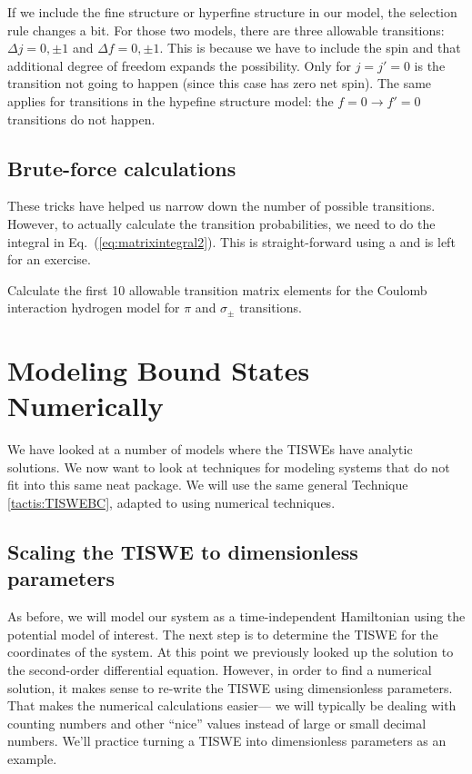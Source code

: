 If we include the fine structure or hyperfine structure in our model, the selection rule changes a bit. For those two models, there are three allowable transitions: $\Delta j = 0,\pm 1$ and $\Delta f = 0, \pm 1$. This is because we have to include the spin and that additional degree of freedom expands the possibility. Only for $j=j'=0$ is the transition not going to happen (since this case has zero net spin). The same applies for transitions in the hypefine structure model: the $f = 0 \rightarrow f'=0$ transitions do not happen.

\section{Brute-force calculations}

These tricks have helped us narrow down the number of possible transitions. However, to actually calculate the transition probabilities, we need to do the integral in Eq.~(\ref{eq:matrixintegral2}). This is straight-forward using a \CAS and is left for an exercise.

\begin{exercise}
Calculate the first 10 allowable transition matrix elements for the Coulomb interaction hydrogen model for $\pi$ and $\sigma_\pm$ transitions.
\end{exercise}


\chapter{Modeling Bound States Numerically}

We have looked at a number of models where the TISWEs have analytic solutions. We now want to look at techniques for modeling systems that do not fit into this same neat package. We will use the same general Technique \ref{tactis:TISWEBC}, adapted to using numerical techniques.

\section{Scaling the TISWE to dimensionless parameters}

As before, we will model our system as a time-independent Hamiltonian using the potential model of interest. The next step is to determine the TISWE for the coordinates of the system. At this point we previously looked up the solution to the second-order differential equation. However, in order to find a numerical solution, it makes sense to re-write the TISWE using dimensionless parameters. That makes the numerical calculations easier--- we will typically be dealing with counting numbers and other ``nice'' values instead of large or small decimal numbers. We'll practice turning a TISWE into dimensionless parameters as an example.

